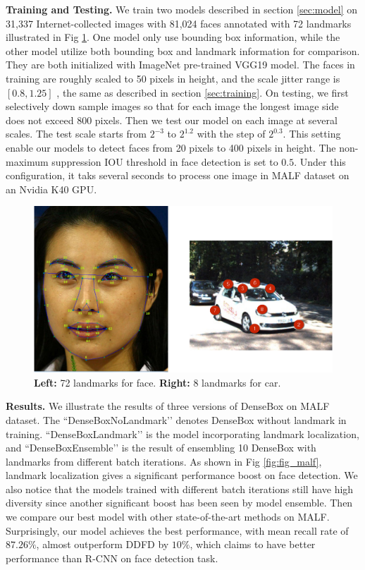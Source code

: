\textbf{Training and Testing.} We train two models described in section \ref{sec:model} on 31,337 Internet-collected  images with  81,024 faces annotated with 72 landmarks illustrated in Fig \ref{fig:fig_landmark}. One model only use bounding box information, while the other model utilize both bounding box and landmark information for comparison. They are both initialized with ImageNet pre-trained VGG19 model.  The faces in training are roughly scaled to 50 pixels in height, and the scale jitter range is $[0.8,1.25]$ , the same as described in section \ref{sec:training}.  On testing, we first selectively down sample images so that for each image the longest image side does not exceed 800 pixels.  Then we test our model on each image at several scales.  The test scale starts from $2^{-3}$ to $2^{1.2}$ with the step of $2^{0.3}$. This setting enable our models to detect faces from 20 pixels to 400 pixels in height. The non-maximum suppression IOU threshold in face detection is set to $0.5$.  Under this configuration, it taks several seconds to process one image in MALF dataset on an Nvidia K40 GPU. 
	\begin{figure} 
	\centering
	 \includegraphics[scale=0.45]{figures/figure_landmark-crop.pdf}
	\caption{\textbf{Left: } 72 landmarks for face. \textbf{Right: } 8 landmarks for car. }
	\label{fig:fig_landmark}
	\end{figure}
\textbf{Results.} 
We illustrate the results of three versions of DenseBox on MALF dataset. The ``DenseBoxNoLandmark’’ denotes DenseBox without landmark in training. ``DenseBoxLandmark’’ is the model incorporating landmark localization, and ``DenseBoxEnsemble’’ is the result of ensembling 10 DenseBox with landmarks from different batch iterations. As shown in Fig \ref{fig:fig_malf}, landmark localization gives a significant performance boost on face detection.  We also notice that the models trained with different batch iterations still have high diversity since another significant boost has been seen by model ensemble. Then we compare our best model with other state-of-the-art methods on MALF. Surprisingly, our model achieves the best performance, with mean recall rate of $87.26\%$, almost outperform DDFD by $10\%$, which claims to have better performance than R-CNN on face detection task. 
 
